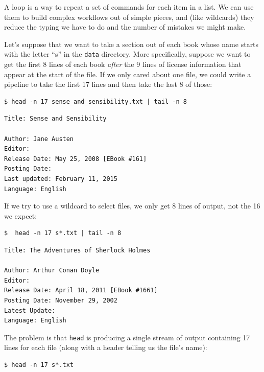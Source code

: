 \documentclass[
]{krantz}
\begin{document}
A loop is a way to repeat a set of commands for each item in a list.
We can use them to build complex workflows out of simple pieces,
and (like wildcards)
they reduce the typing we have to do and the number of mistakes we might make.

Let's suppose that we want to take a section out of each book
whose name starts with the letter ``s'' in the \texttt{data} directory.
More specifically,
suppose we want to get the first 8 lines of each book
\emph{after} the 9 lines of license information that appear at the start of the file.
If we only cared about one file,
we could write a pipeline to take the first 17 lines
and then take the last 8 of those:

\begin{verbatim}
$ head -n 17 sense_and_sensibility.txt | tail -n 8
\end{verbatim}

\begin{verbatim}
Title: Sense and Sensibility

Author: Jane Austen
Editor:
Release Date: May 25, 2008 [EBook #161]
Posting Date:
Last updated: February 11, 2015
Language: English
\end{verbatim}

If we try to use a wildcard to select files,
we only get 8 lines of output,
not the 16 we expect:

\begin{verbatim}
$  head -n 17 s*.txt | tail -n 8
\end{verbatim}

\begin{verbatim}
Title: The Adventures of Sherlock Holmes

Author: Arthur Conan Doyle
Editor:
Release Date: April 18, 2011 [EBook #1661]
Posting Date: November 29, 2002
Latest Update:
Language: English
\end{verbatim}

The problem is that \texttt{head} is producing a single stream of output
containing 17 lines for each file
(along with a header telling us the file's name):

\begin{verbatim}
$ head -n 17 s*.txt
\end{verbatim}
\end{document}
